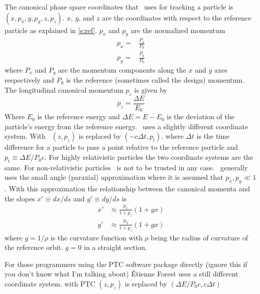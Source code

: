 The canonical phase space coordinates that \bmad\ uses for tracking a
particle is $(x, p_x, y, p_y, z, p_z)$. $x$, $y$, and $z$ are the
coordinates with respect to the reference particle as explained in
\ref{s:ref}. $p_x$ and $p_y$ are the normalized momentum
\begin{align}
  p_x = &\frac{P_x}{P_0} \\
  p_y = &\frac{P_y}{P_0}
\end{align}
where $P_x$ and $P_y$ are the momentum components along the $x$ and
$y$ axes respectively and $P_0$ is the reference (sometimes called the
design) momentum. The longitudinal canonical momentum $p_z$ is given by
\begin{equation}
  p_z = \frac{\Delta E}{E_0}
\end{equation}
Where $E_0$ is the reference energy and $\Delta E = E - E_0$ is the
deviation of the particle's energy from the reference energy. \mad\ uses
a slightly different coordinate system. With \mad\ $(z, p_z)$ is
replaced by $(-c\Delta t, p_t)$. where $\Delta t$ is the time
difference for a particle to pass a point relative to the reference
particle and $p_t \equiv \Delta E / P_0 c$. For highly relativistic
particles the two coordinate systems are the same. For
non-relativistic particles \bmad\ is not to be trusted in any
case. \bmad\ generally uses the small angle (paraxial) approximation
where it is assumed that $p_x, p_y \ll 1$. With this approximation the
relationship between the canonical momenta and the slopes $x' \equiv dx/ds$
and $y' \equiv dy/ds$ is
\begin{align}
  x' &\approx \frac{p_x}{1 + p_z} (1 + g x) \\
  y' &\approx \frac{p_y}{1 + p_z} (1 + g x) 
\end{align}
where $g = 1/\rho$ is the curvature function with $\rho$ being the radius
of curvature of the reference orbit. $g = 0$ in a straight section.

For those programmers using the PTC software package directly (ignore
this if you don't know what I'm talking about) \'Etienne Forest uses a still
different coordinate system. with PTC $(z, p_z)$ is replaced by
$(\Delta E/P_0 c, c \Delta t)$